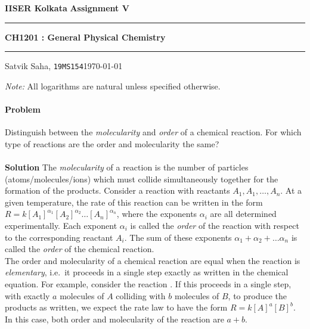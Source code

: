 \documentclass[10pt]{article}
\newcounter{prob}
\def\problem{\stepcounter{prob}\paragraph{Problem \arabic{prob}}}
\def\solution{\\\\\textbf{Solution }}
\begin{document}
        \par\textbf{IISER Kolkata} \hfill \textbf{Assignment V}
        \vspace{3pt}
        \hrule
        \vspace{3pt}
        \begin{center}
                \LARGE{\textbf{CH1201 : General Physical Chemistry}}
        \end{center}
        \vspace{3pt}
        \hrule
        \vspace{3pt}
        Satvik Saha, \texttt{19MS154}\hfill\today
        \vspace{20pt}

        \textit{Note:} All logarithms are natural unless specified otherwise.

        \problem Distinguish between the {\it molecularity} and {\it order} of a chemical reaction.
        For which type of reactions are the order and molecularity the same?
        \solution The \textit{molecularity} of a reaction is the number of particles (atoms/molecules/ions) which must collide simultaneously
        together for the formation of the products. Consider a reaction with reactants $A_1, A_1, \dots, A_n$. At a given temperature,
        the rate of this reaction can be written in the form $R = k[A_1]^{\alpha_1}[A_2]^{\alpha_2}\dots[A_n]^{\alpha_n}$, where the 
        exponents $\alpha_i$ are all determined experimentally. Each exponent $\alpha_i$ is called the \textit{order} of the reaction with respect to 
        the corresponding reactant $A_i$. The sum of these exponents $\alpha_1 + \alpha_2 + \dots \alpha_n$ is called the \textit{order} of
        the chemical reaction. \\

        The order and molecularity of a chemical reaction are equal when the reaction is \textit{elementary}, i.e.\ it proceeds in a single
        step exactly as written in the chemical equation. For example, consider the reaction .
        If this proceeds in a single step, with exactly $a$ molecules of $A$ colliding with $b$ molecules of $B$, to produce
        the products as written, we expect the rate law to have the form $R = k[A]^a[B]^b$. In this case, both order and molecularity
        of the reaction are $a + b$.
\end{document}
